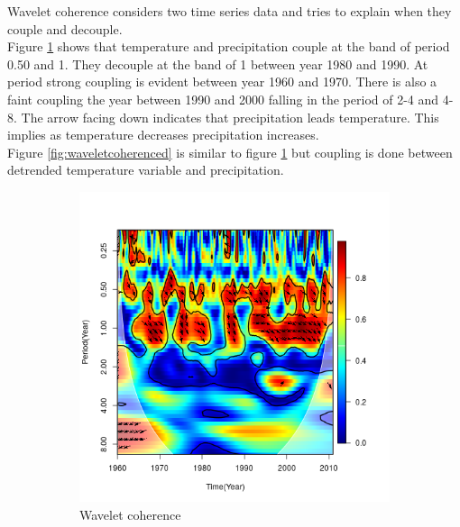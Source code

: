 \documentclass[12pt,a4paper]{article}
\begin{document}
\newpage
\noindent Wavelet coherence considers two time series data and tries to explain when they couple and decouple.\\
Figure \ref{fig:waveletcoherence} shows that temperature and precipitation couple at the band of period 0.50 and 1. They decouple at the band of 1 between year 1980 and 1990. At period strong coupling is evident between year 1960 and 1970. There is also a faint coupling the year between 1990 and 2000 falling in the period of 2-4  and 4-8. The arrow facing down indicates that precipitation leads temperature. This implies as temperature decreases precipitation increases.\\
Figure \ref{fig:waveletcoherenced} is similar to figure  \ref{fig:waveletcoherence} but coupling is done between detrended temperature variable and precipitation. 
\begin{figure}[h]
	\centering
\begin{subfigure}[b]{0.3\textheight}
	\includegraphics[width=\linewidth]{wavelet_coherence}
	\caption{Wavelet coherence}
	\label{fig:waveletcoherence}
\end{subfigure}
\begin{subfigure}[b]{0.3\textheight}

\end{subfigure}
\end{figure}
\end{document}
